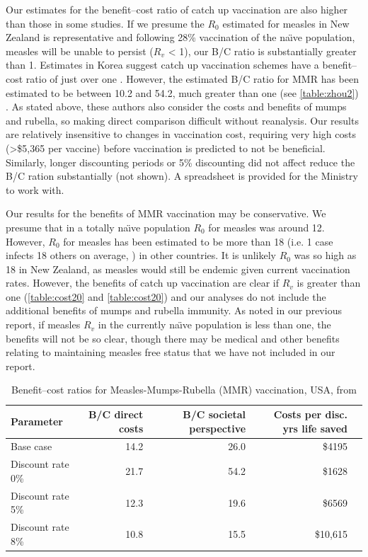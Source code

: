 \documentclass{article}
\begin{document}
Our estimates for the benefit--cost ratio of catch up vaccination are also higher than those in some studies. If we presume the $R_0$ estimated for measles in New Zealand is representative and following 28\% vaccination of the na\"{\i}ve population, measles will be unable to persist ($R_v$ < 1), our B/C ratio is substantially greater than 1. Estimates in Korea suggest catch up vaccination schemes have a benefit--cost ratio of just over one \citep{bae13}. However,  the estimated B/C ratio for MMR has been estimated to be between 10.2 and 54.2, much greater than one (see \autoref{table:zhou2}) \citep{zhou4}. As stated above, these authors also consider the costs and benefits of mumps and rubella, so making direct comparison difficult without reanalysis. Our results are relatively insensitive to changes in vaccination cost, requiring very high costs (>\$5,365 per vaccine) before vaccination is predicted to not be beneficial. Similarly, longer discounting periods or 5\% discounting did not affect reduce the B/C ration substantially (not shown). A spreadsheet is provided for the Ministry to work with.

Our results for the benefits of MMR vaccination may be conservative. We presume that in a totally na\"{\i}ve population $R_0$ for measles was around 12. However, $R_0$ for measles has been estimated to be more than 18 (i.e. 1 case infects 18 others on average, \citep{anderson91}) in other countries. It is unlikely $R_0$ was so high as 18 in New Zealand, as measles would still be endemic given current vaccination rates. However, the benefits of catch up vaccination are clear if $R_v$ is greater than one (\autoref{table:cost20} and \autoref{table:cost20}) and our analyses do not include the additional benefits of mumps and rubella immunity. As noted in our previous report, if measles $R_v$ in the currently na\"{\i}ve population is less than one, the benefits will not be so clear, though there may be medical and other benefits relating to maintaining measles free status that we have not included in our report.

\begin{table}
\begin{center}
\begin{tabular}{lrrrr}
\hline
Parameter & B/C direct costs & B/C societal perspective & Costs per disc. yrs life saved\\
\hline
Base case & 14.2 & 26.0 & \$4195 \\
Discount rate 0\% & 21.7 & 54.2 & \$1628 \\
Discount rate 5\% & 12.3 & 19.6 & \$6569 \\
Discount rate 8\% & 10.8 & 15.5 & \$10,615 \\
\hline
\end{tabular}
\end{center}
\caption{Benefit--cost ratios for Measles-Mumps-Rubella (MMR) vaccination, USA, from \citep{zhou4}}
\label{table:zhou2}
\end{table}%
\end{document}
